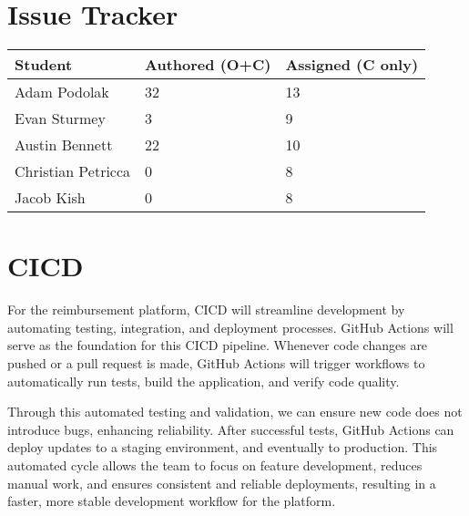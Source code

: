 \documentclass{article}
\begin{document}

\section{Issue Tracker}


\begin{table}[H]
\centering
\begin{tabular}{lll}
\toprule
\textbf{Student} & \textbf{Authored (O+C)} & \textbf{Assigned (C only)}\\
\midrule
Adam Podolak & 32 & 13 \\
Evan Sturmey & 3 & 9 \\
Austin Bennett & 22 & 10 \\
Christian Petricca & 0 & 8 \\
Jacob Kish & 0 & 8 \\
\bottomrule
\end{tabular}
\end{table}


\section{CICD}

For the reimbursement platform, CICD will streamline development by automating testing, integration, and deployment processes. GitHub Actions will serve as the foundation for this CICD pipeline. Whenever code changes are pushed or a pull request is made, GitHub Actions will trigger workflows to automatically run tests, build the application, and verify code quality.

Through this automated testing and validation, we can ensure new code does not introduce bugs, enhancing reliability. After successful tests, GitHub Actions can deploy updates to a staging environment, and eventually to production. This automated cycle allows the team to focus on feature development, reduces manual work, and ensures consistent and reliable deployments, resulting in a faster, more stable development workflow for the platform.


\end{document}
